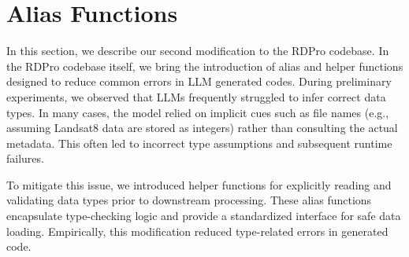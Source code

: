 \section{Alias Functions}
In this section, we describe our second modification to the RDPro codebase. In the RDPro codebase itself, we bring the introduction of alias and helper functions designed to reduce common errors in LLM generated codes. During preliminary experiments, we observed that LLMs frequently struggled to infer correct data types. In many cases, the model relied on implicit cues such as file names (e.g., assuming Landsat8 data are stored as integers) rather than consulting the actual metadata. This often led to incorrect type assumptions and subsequent runtime failures.

To mitigate this issue, we introduced helper functions for explicitly reading and validating data types prior to downstream processing. These alias functions encapsulate type-checking logic and provide a standardized interface for safe data loading. Empirically, this modification reduced type-related errors in generated code.

